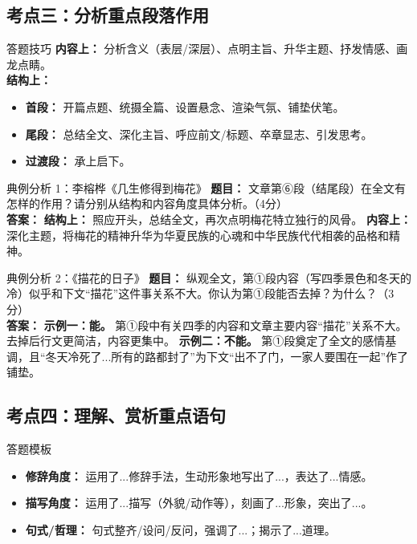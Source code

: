 \documentclass[11pt, a4paper]{ctexart}
\begin{document}
\subsection{考点三：分析重点段落作用}

\begin{tipsbox}{答题技巧}
\textbf{内容上：} 分析含义（表层/深层）、点明主旨、升华主题、抒发情感、画龙点睛。\\
\textbf{结构上：}
\begin{itemize}
    \item \textbf{首段：} 开篇点题、统摄全篇、设置悬念、渲染气氛、铺垫伏笔。
    \item \textbf{尾段：} 总结全文、深化主旨、呼应前文/标题、卒章显志、引发思考。
    \item \textbf{过渡段：} 承上启下。
\end{itemize}
\end{tipsbox}

\begin{examplebox}{典例分析 1：李榕桦《几生修得到梅花》}
\textbf{题目：} 文章第⑥段（结尾段）在全文有怎样的作用？请分别从结构和内容角度具体分析。（4分）\\
\textbf{答案：}
\textbf{结构上：} 照应开头，总结全文，再次点明梅花特立独行的风骨。
\textbf{内容上：} 深化主题，将梅花的精神升华为华夏民族的心魂和中华民族代代相袭的品格和精神。
\end{examplebox}

\begin{examplebox}{典例分析 2：《描花的日子》}
\textbf{题目：} 纵观全文，第①段内容（写四季景色和冬天的冷）似乎和下文“描花”这件事关系不大。你认为第①段能否去掉？为什么？（3分）\\
\textbf{答案：}
\textbf{示例一：能。} 第①段中有关四季的内容和文章主要内容“描花”关系不大。去掉后行文更简洁，内容更集中。
\textbf{示例二：不能。} 第①段奠定了全文的感情基调，且“冬天冷死了...所有的路都封了”为下文“出不了门，一家人要围在一起”作了铺垫。
\end{examplebox}

\subsection{考点四：理解、赏析重点语句}

\begin{tipsbox}{答题模板}
\begin{itemize}
    \item \textbf{修辞角度：} 运用了...修辞手法，生动形象地写出了...，表达了...情感。
    \item \textbf{描写角度：} 运用了...描写（外貌/动作等），刻画了...形象，突出了...。
    \item \textbf{句式/哲理：} 句式整齐/设问/反问，强调了...；揭示了...道理。
\end{itemize}
\end{tipsbox}
\end{document}
